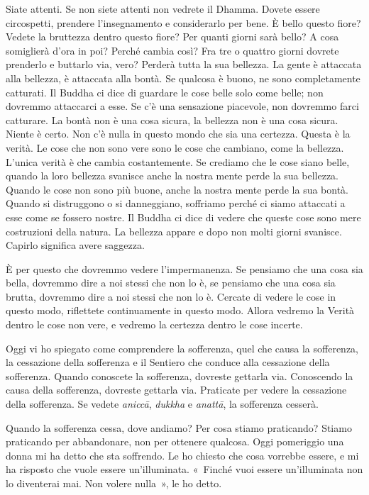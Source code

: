 Siate attenti. Se non siete attenti non vedrete il Dhamma. Dovete essere
circospetti, prendere l'insegnamento e considerarlo per bene. È bello
questo fiore? Vedete la bruttezza dentro questo fiore? Per quanti giorni
sarà bello? A cosa somiglierà d'ora in poi? Perché cambia così? Fra tre
o quattro giorni dovrete prenderlo e buttarlo via, vero? Perderà tutta
la sua bellezza. La gente è attaccata alla bellezza, è attaccata alla
bontà. Se qualcosa è buono, ne sono completamente catturati. Il Buddha
ci dice di guardare le cose belle solo come belle; non dovremmo
attaccarci a esse. Se c'è una sensazione piacevole, non dovremmo farci
catturare. La bontà non è una cosa sicura, la bellezza non è una cosa
sicura. Niente è certo. Non c'è nulla in questo mondo che sia una
certezza. Questa è la verità. Le cose che non sono vere sono le cose che
cambiano, come la bellezza. L'unica verità è che cambia costantemente.
Se crediamo che le cose siano belle, quando la loro bellezza svanisce
anche la nostra mente perde la sua bellezza. Quando le cose non sono più
buone, anche la nostra mente perde la sua bontà. Quando si distruggono o
si danneggiano, soffriamo perché ci siamo attaccati a esse come se
fossero nostre. Il Buddha ci dice di vedere che queste cose sono mere
costruzioni della natura. La bellezza appare e dopo non molti giorni
svanisce. Capirlo significa avere saggezza.

È per questo che dovremmo vedere l'impermanenza. Se pensiamo che una
cosa sia bella, dovremmo dire a noi stessi che non lo è, se pensiamo che
una cosa sia brutta, dovremmo dire a noi stessi che non lo è. Cercate di
vedere le cose in questo modo, riflettete continuamente in questo modo.
Allora vedremo la Verità dentro le cose non vere, e vedremo la certezza
dentro le cose incerte.

Oggi vi ho spiegato come comprendere la sofferenza, quel che causa la
sofferenza, la cessazione della sofferenza e il Sentiero che conduce
alla cessazione della sofferenza. Quando conoscete la sofferenza,
dovreste gettarla via. Conoscendo la causa della sofferenza, dovreste
gettarla via. Praticate per vedere la cessazione della sofferenza. Se
vedete \emph{aniccā}, \emph{dukkha} e \emph{anattā}, la sofferenza
cesserà.

Quando la sofferenza cessa, dove andiamo? Per cosa stiamo praticando?
Stiamo praticando per abbandonare, non per ottenere qualcosa. Oggi
pomeriggio una donna mi ha detto che sta soffrendo. Le ho chiesto che
cosa vorrebbe essere, e mi ha risposto che vuole essere un'illuminata.
«~Finché vuoi essere un'illuminata non lo diventerai mai. Non volere
nulla~», le ho detto.

